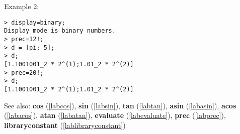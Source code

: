 \noindent Example 2: 
\begin{center}\begin{minipage}{15cm}\begin{Verbatim}[frame=single,commandchars=\\\|\~]
> display=binary;
Display mode is binary numbers.
> prec=12!;
> d = [pi; 5];
> d;
[1.1001001_2 * 2^(1);1.01_2 * 2^(2)]
> prec=20!;
> d;
[1.1001001_2 * 2^(1);1.01_2 * 2^(2)]
\end{Verbatim}
\end{minipage}\end{center}
See also: \textbf{cos} (\ref{labcos}), \textbf{sin} (\ref{labsin}), \textbf{tan} (\ref{labtan}), \textbf{asin} (\ref{labasin}), \textbf{acos} (\ref{labacos}), \textbf{atan} (\ref{labatan}), \textbf{evaluate} (\ref{labevaluate}), \textbf{prec} (\ref{labprec}), \textbf{libraryconstant} (\ref{lablibraryconstant})
